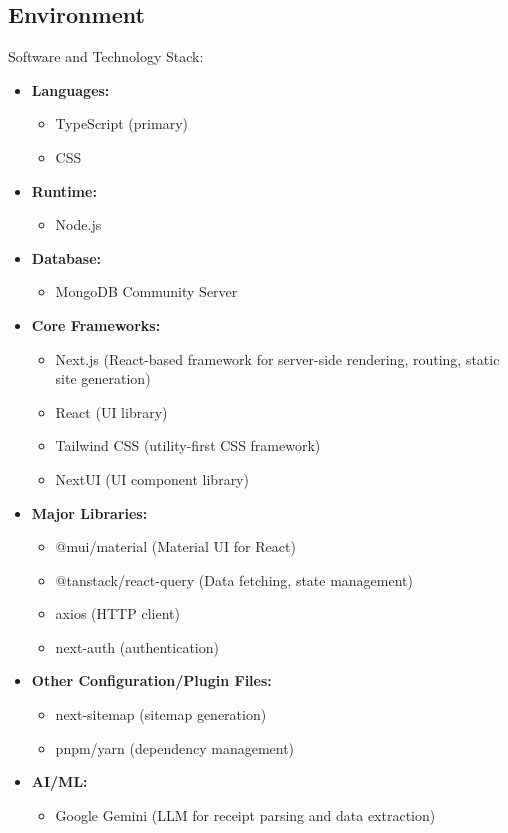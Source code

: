 \documentclass{article}
\begin{document}
\subsection{Environment}

Software and Technology Stack:
\begin{itemize}
  \item \textbf{Languages:}
    \begin{itemize}
      \item TypeScript (primary)
      \item CSS
    \end{itemize}
  \item \textbf{Runtime:}
    \begin{itemize}
      \item Node.js
    \end{itemize}
  \item \textbf{Database:}
    \begin{itemize}
      \item MongoDB Community Server
    \end{itemize}
  \item \textbf{Core Frameworks:}
    \begin{itemize}
      \item Next.js (React-based framework for server-side rendering, routing, static site generation)
      \item React (UI library)
      \item Tailwind CSS (utility-first CSS framework)
      \item NextUI (UI component library)
    \end{itemize}
  \item \textbf{Major Libraries:}
    \begin{itemize}
      \item @mui/material (Material UI for React)
      \item @tanstack/react-query (Data fetching, state management)
      \item axios (HTTP client)
      \item next-auth (authentication)
    \end{itemize}
  \item \textbf{Other Configuration/Plugin Files:}
    \begin{itemize}
      \item next-sitemap (sitemap generation)
      \item pnpm/yarn (dependency management)
    \end{itemize}
  \item \textbf{AI/ML:}
    \begin{itemize}
      \item Google Gemini (LLM for receipt parsing and data extraction)
    \end{itemize}
\end{itemize}
\end{document}
